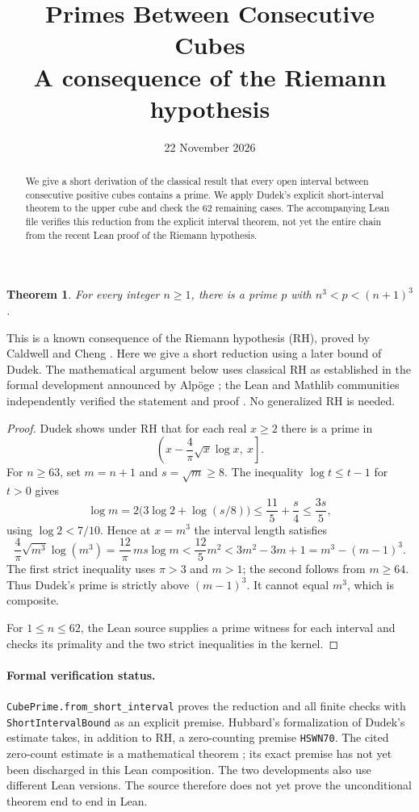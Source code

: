 \documentclass[11pt]{article}
\title{Primes Between Consecutive Cubes\\[3pt]\large A consequence of the Riemann hypothesis}
\author{}
\date{22 November 2026}
\newtheorem*{theorem}{Theorem}
\begin{document}
\maketitle
\begin{abstract}
We give a short derivation of the classical result that every open interval
between consecutive positive cubes contains a prime. We apply Dudek's
explicit short-interval theorem to the upper cube and check the 62
remaining cases. The accompanying Lean file verifies this reduction from
the explicit interval theorem, not yet the entire chain from the
recent Lean proof of the Riemann hypothesis.
\end{abstract}

\begin{theorem}
For every integer $n\ge1$, there is a prime $p$ with
$n^3<p<(n+1)^3$.
\end{theorem}

This is a known consequence of the Riemann hypothesis (RH), proved by
Caldwell and Cheng \cite{CC}. Here we give a short reduction using a later
bound of Dudek. The mathematical argument below uses classical RH as
established in the formal development announced by Alp\"oge \cite{A};
the Lean and Mathlib communities independently verified the statement
and proof \cite{V}. No generalized RH is needed.

\begin{proof}
Dudek \cite[Theorem~2]{D} shows under RH that for each real $x\ge2$ there
is a prime in
\[
\left(x-\frac4\pi\sqrt{x}\log x,\ x\right].
\]
For $n\ge63$, set $m=n+1$ and $s=\sqrt m\ge8$.
The inequality $\log t\le t-1$ for $t>0$ gives
\[
\log m=2\bigl(3\log 2+\log(s/8)\bigr)
 \le \frac{11}{5}+\frac{s}{4}\le\frac{3s}{5},
\]
using $\log 2<7/10$. Hence at $x=m^3$ the interval length satisfies
\[
\frac4\pi\sqrt{m^3}\log(m^3)
=\frac{12}{\pi}\,ms\log m
< \frac{12}{5}m^2
< 3m^2-3m+1=m^3-(m-1)^3 .
\]
The first strict inequality uses $\pi>3$ and $m>1$; the second follows
from $m\ge64$. Thus Dudek's prime is strictly above $(m-1)^3$. It
cannot equal $m^3$, which is composite.

For $1\le n\le62$, the Lean source supplies a prime witness for each
interval and checks its primality and the two strict inequalities in the
kernel.
\end{proof}

\paragraph{Formal verification status.}
\texttt{CubePrime.from\_short\_interval} proves the reduction and all
finite checks with \texttt{ShortIntervalBound} as an explicit premise.
Hubbard's formalization of Dudek's estimate \cite{H} takes, in addition
to RH, a zero-counting premise \texttt{HSWN70}. The cited zero-count
estimate is a mathematical theorem \cite{HSW}; its exact premise has
not yet been discharged in this Lean composition. The two developments
also use different Lean versions. The source therefore does not yet
prove the unconditional theorem end to end in Lean.
\end{document}
